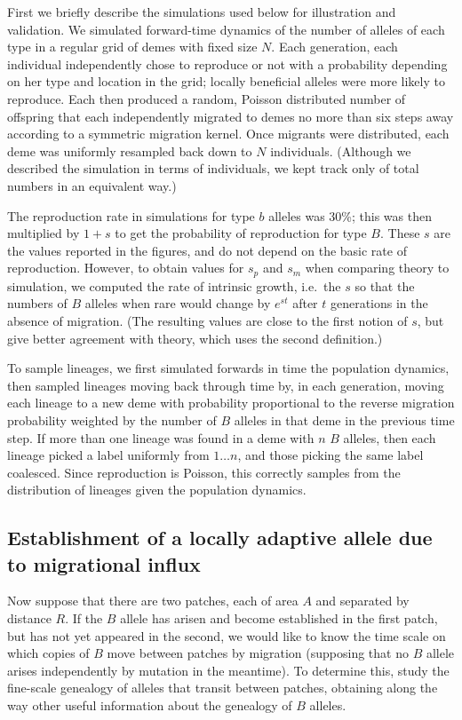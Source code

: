 \documentclass{article}
\begin{document}
First we briefly describe the simulations used below for illustration and validation.
We simulated forward-time dynamics of the number of alleles of each type in a regular grid of demes with fixed size $N$.
Each generation, each individual independently chose to reproduce or not with a probability depending on her type and location in the grid;
locally beneficial alleles were more likely to reproduce.
Each then produced a random, Poisson distributed number of offspring that each independently migrated to demes no more than six steps away
according to a symmetric migration kernel.
Once migrants were distributed, each deme was uniformly resampled back down to $N$ individuals.
(Although we described the simulation in terms of individuals,
we kept track only of total numbers in an equivalent way.)

The reproduction rate in simulations for type $b$ alleles was 30\%; 
this was then multiplied by $1+s$ to get the probability of reproduction for type $B$.
These $s$ are the values reported in the figures, and do not depend on the basic rate of reproduction.
However, to obtain values for $s_p$ and $s_m$ when comparing theory to simulation,
we computed the rate of intrinsic growth, 
i.e.\ the $s$ so that the numbers of $B$ alleles when rare would change by $e^{st}$ after $t$ generations
in the absence of migration.
(The resulting values are close to the first notion of $s$,
but give better agreement with theory,
which uses the second definition.)

To sample lineages, we first simulated forwards in time the population dynamics,
then sampled lineages moving back through time
by, in each generation,
moving each lineage to a new deme with probability proportional to the reverse migration probability
weighted by the number of $B$ alleles in that deme in the previous time step.
If more than one lineage was found in a deme with $n$ $B$ alleles,
then each lineage picked a label uniformly from $1 \ldots n$,
and those picking the same label coalesced.
Since reproduction is Poisson, this correctly samples from the distribution of lineages given the population dynamics.

\subsection[Establishment by Migration]{Establishment of a locally adaptive allele due to migrational influx}
\label{ss:patchymigration}

Now suppose that there are two patches, each of area $A$ and separated by distance $R$. 
If the $B$ allele has arisen and become established in the first patch, but has not yet appeared in the second,
we would like to know the time scale on which copies of $B$ move between patches by migration
(supposing that no $B$ allele arises independently by mutation in the meantime).
To determine this, 
study the fine-scale genealogy of alleles that transit between patches,
obtaining along the way other useful information about the genealogy of $B$ alleles.
\end{document}
